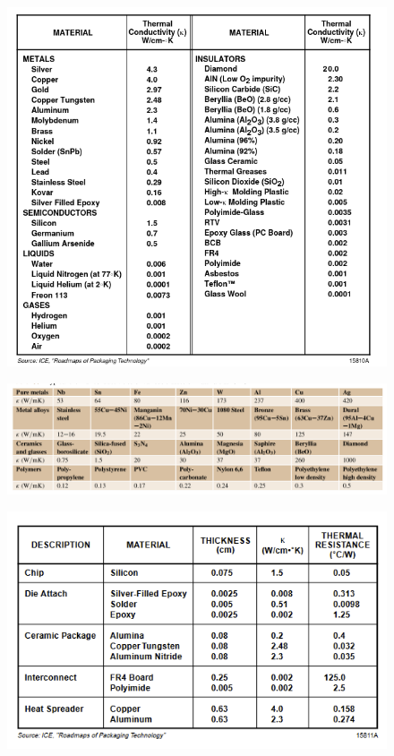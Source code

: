 \documentclass[final]{cubedoc}
\begin{document}
	\begin{figure}[h!]
		\centering
		\includegraphics[width=\linewidth]{docs/table_properties_smith.png}
		\caption{\cite[6-14]{chip}}
		\label{fig:intel_conduct}
	\end{figure}
	
	\begin{figure}[h!]
		\centering
		\includegraphics[width=\linewidth]{docs/table_properties_springer2.png}
		\caption{\cite[p.431]{kasap2017springer}}
		\label{fig:my_label}
	\end{figure}
	
	\begin{figure}[h!]
		\centering
		\includegraphics{docs/chip_properties.png}
		\caption{\cite[p.6-12]{chip}}
		\label{fig:my_label}
	\end{figure}
	
\end{document}
